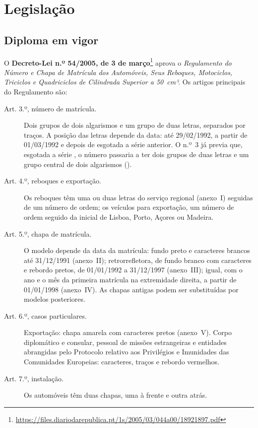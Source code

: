 \section{Legislação}\label{sec:legislacao}

\subsection{Diploma em vigor}

O \textbf{Decreto-Lei n.º 54/2005, de 3 de março}\footnote{\url{https://files.diariodarepublica.pt/1s/2005/03/044a00/18921897.pdf}}
aprova o \emph{Regulamento do Número e Chapa de Matrícula dos Automóveis, Seus
Reboques, Motociclos, Triciclos e Quadriciclos de Cilindrada Superior a
50~cm³}. Os artigos principais do Regulamento são:

\begin{description}
  \item[Art. 3.º, número de matrícula.] Dois grupos de dois algarismos e um grupo
    de duas letras, separados por traços. A posição das letras depende da data:
     até 29/02/1992,  a partir de 01/03/1992 e
     depois de esgotada a série anterior. O n.º~3 já previa que,
    esgotada a série , o número passaria a ter dois grupos de duas
    letras e um grupo central de dois algarismos ().
  \item[Art. 4.º, reboques e exportação.] Os reboques têm uma ou duas letras do
    serviço regional (anexo~I) seguidas de um número de ordem; os veículos para
    exportação, um número de ordem seguido da inicial de Lisboa, Porto, Açores ou
    Madeira.
  \item[Art. 5.º, chapa de matrícula.] O modelo depende da data da matrícula:
    fundo preto e caracteres brancos até 31/12/1991 (anexo~II); retrorrefletora,
    de fundo branco com caracteres e rebordo pretos, de 01/01/1992 a 31/12/1997
    (anexo~III); igual, com o ano e o mês da primeira matrícula na extremidade
    direita, a partir de 01/01/1998 (anexo~IV). As chapas antigas podem ser
    substituídas por modelos posteriores.
  \item[Art. 6.º, casos particulares.] Exportação: chapa amarela com caracteres
    pretos (anexo~V). Corpo diplomático e consular, pessoal de missões
    estrangeiras e entidades abrangidas pelo Protocolo relativo aos Privilégios e
    Imunidades das Comunidades Europeias: caracteres, traços e rebordo vermelhos.
  \item[Art. 7.º, instalação.] Os automóveis têm duas chapas, uma à frente e
    outra atrás.
\end{description}

